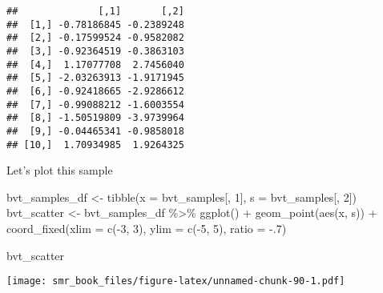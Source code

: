 \documentclass[
  oneside]{book}
\newenvironment{Shaded}{\begin{snugshade}}{\end{snugshade}}
\newcommand{\AttributeTok}[1]{\textcolor[rgb]{0.77,0.63,0.00}{#1}}
\newcommand{\DecValTok}[1]{\textcolor[rgb]{0.00,0.00,0.81}{#1}}
\newcommand{\FunctionTok}[1]{\textcolor[rgb]{0.00,0.00,0.00}{#1}}
\newcommand{\NormalTok}[1]{#1}
\newcommand{\OtherTok}[1]{\textcolor[rgb]{0.56,0.35,0.01}{#1}}
\newcommand{\SpecialCharTok}[1]{\textcolor[rgb]{0.00,0.00,0.00}{#1}}
\begin{document}
\begin{verbatim}
##              [,1]       [,2]
##  [1,] -0.78186845 -0.2389248
##  [2,] -0.17599524 -0.9582082
##  [3,] -0.92364519 -0.3863103
##  [4,]  1.17077708  2.7456040
##  [5,] -2.03263913 -1.9171945
##  [6,] -0.92418665 -2.9286612
##  [7,] -0.99088212 -1.6003554
##  [8,] -1.50519809 -3.9739964
##  [9,] -0.04465341 -0.9858018
## [10,]  1.70934985  1.9264325
\end{verbatim}

Let's plot this sample

\begin{Shaded}
\begin{Highlighting}[]
\NormalTok{bvt\_samples\_df }\OtherTok{\textless{}{-}} \FunctionTok{tibble}\NormalTok{(}\AttributeTok{x =}\NormalTok{ bvt\_samples[, }\DecValTok{1}\NormalTok{], }\AttributeTok{s =}\NormalTok{ bvt\_samples[, }\DecValTok{2}\NormalTok{])}
\NormalTok{bvt\_scatter }\OtherTok{\textless{}{-}}\NormalTok{ bvt\_samples\_df }\SpecialCharTok{\%\textgreater{}\%}
  \FunctionTok{ggplot}\NormalTok{() }\SpecialCharTok{+}
  \FunctionTok{geom\_point}\NormalTok{(}\FunctionTok{aes}\NormalTok{(x, s)) }\SpecialCharTok{+}
  \FunctionTok{coord\_fixed}\NormalTok{(}\AttributeTok{xlim =} \FunctionTok{c}\NormalTok{(}\SpecialCharTok{{-}}\DecValTok{3}\NormalTok{, }\DecValTok{3}\NormalTok{), }\AttributeTok{ylim =} \FunctionTok{c}\NormalTok{(}\SpecialCharTok{{-}}\DecValTok{5}\NormalTok{, }\DecValTok{5}\NormalTok{), }\AttributeTok{ratio =} \SpecialCharTok{{-}}\NormalTok{.}\DecValTok{7}\NormalTok{)}

\NormalTok{bvt\_scatter}
\end{Highlighting}
\end{Shaded}

\texttt{[image: smr\_book\_files/figure-latex/unnamed-chunk-90-1.pdf]}
\end{document}
